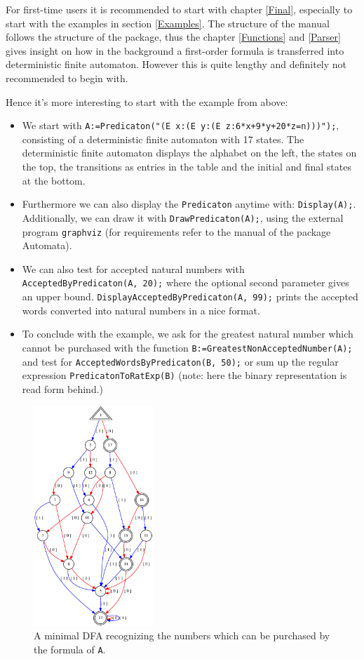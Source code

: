 \documentclass[a4paper,11pt]{report}
\begin{document}
{ For first-time users it is recommended to start with chapter \ref{Final}, especially to start with the examples in section \ref{Examples}. The structure of the manual follows the structure of the package, thus the
chapter \ref{Functions} and \ref{Parser} gives insight on how in the background a first-order formula is transferred
into deterministic finite automaton. However this is quite lengthy and
definitely not recommended to begin with. 

 \newpage Hence it's more interesting to start with the example from above: 
\begin{itemize}
\item We start with \texttt{A:=Predicaton("(E x:(E y:(E z:6*x+9*y+20*z=n)))");}, consisting of a deterministic finite automaton with 17 states. The
deterministic finite automaton displays the alphabet on the left, the states
on the top, the transitions as entries in the table and the initial and final
states at the bottom.
\item Furthermore we can also display the \texttt{Predicaton} anytime with: \texttt{Display(A);}. Additionally, we can draw it with \texttt{DrawPredicaton(A);}, using the external program \texttt{graphviz} (for requirements refer to the manual of the package \textsf{Automata}).
\item We can also test for accepted natural numbers with \texttt{AcceptedByPredicaton(A, 20);} where the optional second parameter gives an upper bound. \texttt{DisplayAcceptedByPredicaton(A, 99);} prints the accepted words converted into natural numbers in a nice format.
\item To conclude with the example, we ask for the greatest natural number which
cannot be purchased with the function \texttt{B:=GreatestNonAcceptedNumber(A);} and test for \texttt{AcceptedWordsByPredicaton(B, 50);} or sum up the regular expression \texttt{PredicatonToRatExp(B)} (note: here the binary representation is read form behind.)
\end{itemize}
 
\begin{figure}[ht]
	\centering
  \includegraphics[width=0.4\textwidth]{img/aut1.jpg}
	\caption{A minimal DFA recognizing the numbers which can be purchased by the formula of \texttt{A}.}
	\label{aut1}
\end{figure}
  }
\end{document}
